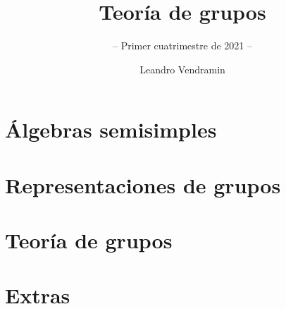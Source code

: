 \documentclass[graybox,envcountsect]{svmono}
\begin{document}
\lstset{language=GAP,
  showstringspaces=false,
  xleftmargin=0.0cm,
  xrightmargin=0.0cm,
  basicstyle=\small\ttfamily,
  frame=single,
  framerule=0pt,
}

\renewcommand{\thesection}{\arabic{chapter}} 

\author{Leandro Vendramin}
\title{Teoría de grupos}
\subtitle{-- Primer cuatrimestre de 2021 --}
\maketitle

\frontmatter

%
%

%

\tableofcontents

%

\mainmatter

\part{Álgebras semisimples}




\part{Representaciones de grupos}














\part{Teoría de grupos}













\part{Extras}








\backmatter
%





\printindex
\end{document}
